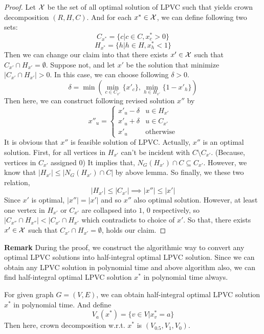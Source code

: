 \documentclass[12pt, a4paper, openany, twoside]{book}
\theoremstyle{definition}
\theoremstyle{remark}
\theoremstyle{plain}
\numberwithin{equation}{section}
\begin{document}
\begin{proof}
    
Let ${\mathcal {X}}$ be the set of all optimal solution of \textsc{LPVC} such that yields crown decomposition $(R, H, C)$. 
And for each $x^* \in {\mathcal {X}}$, we can define following two sets: 
\[C_{x^*} = \{c | c \in C , x^*_c > 0\}\]
\[H_{x^*} = \{h | h \in H, x^*_h < 1\}\]
Then we can change our claim into that there exists $x' \in {\mathcal {X}}$ such that $C_{x'} \cap H_{x'} = \emptyset$. 
Suppose not, and let $x'$ be the solution that minimize $|C_{x'} \cap H_{x'}| > 0$. In this case, we can choose following $\delta > 0$. 
\[\delta = \min \left( \min_{c \in C_{x'}} \{x'_c\}, \min_{h \in H_{x'}} \{1 - x'_h\} \right)\]
Then here, we can construct following revised solution $x''$ by 
\[x''_u = \begin{cases}
    x'_u - \delta & u \in H_{x'} \\
    x'_u + \delta & u \in C_{x'} \\
    x'_u & \text{otherwise}
\end{cases}\]
It is obvious that $x''$ is feasible solution of \textsc{LPVC}. Actually, $x''$ is an optimal solution. 
First, for all vertices in $H_{x'}$ can't be incident with $C \setminus C_{x'}$. (Because, vertices in $C_{x'}$ assigned $0$)
It implies that, $N_G(H_{x'}) \cap C \subseteq C_{x'}$. However, we know that $|H_{x'}| \leq |N_G(H_{x'}) \cap C|$ by above lemma. 
So finally, we these two relation, 
\[|H_{x'}| \leq |C_{x'}| \implies |x''| \leq |x'|\]
Since $x'$ is optimal, $|x''| = |x'|$ and so $x''$ also optimal solution. However, at least one vertex in $H_{x'}$ or $C_{x'}$ are collapsed into $1$, $0$ respectively, 
so $|C_{x''} \cap H_{x''}| < |C_{x'} \cap H_{x'}$ which contradicts to choice of $x'$. So that, there exists $x' \in {\mathcal {X}}$ such that 
$C_{x'} \cap H_{x'} = \emptyset$, holds our claim. 
\end{proof}

\textbf{Remark} During the proof, we construct the algorithmic way to convert any optimal LPVC solutions into half-integral optimal LPVC solution. 
Since we can obtain any LPVC solution in polynomial time and above algorithm also, 
we can find half-integral optimal LPVC solution $x^*$ in polynomial time always. 

\begin{tcolorbox}[colback=yellow!10!white,colframe=green!75!black,title=Obtain Half-Integral Solution]

For given graph $G = (V, E)$, we can obtain half-integral optimal LPVC solution $x^*$ in polynomial time.
And define 
\[V_a(x^*) = \{v \in V | x^*_v = a\}\]
Then here, crown decomposition w.r.t. $x^*$ is $(V_{0.5}, V_1, V_0)$. 
\end{tcolorbox}
\end{document}
